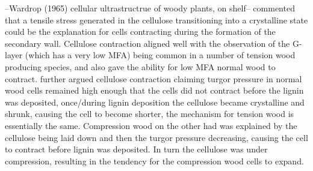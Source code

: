 --Wardrop (1965) cellular ultrastructrue of woody plants, on shelf-- commented that a tensile stress generated in the cellulose
transitioning into a crystalline state could be the explanation for cells
contracting during the formation of the secondary wall. Cellulose contraction
aligned well with the observation of the G-layer (which has  a very low
MFA) being common in a number of tension wood producing species, and also gave
the ability for low MFA normal wood to contract. \cite{Bamber1979} further argued
cellulose contraction claiming turgor pressure in normal wood cells remained
high enough that the cells did not contract before the lignin was deposited,
once/during lignin deposition the cellulose became crystalline and shrunk,
causing the cell to become shorter, the mechanism for tension wood is
essentially the same. Compression wood on the other had was explained by the
cellulose being laid down and then the turgor pressure decreasing, causing the
cell to contract before lignin was deposited. In turn the cellulose was under
compression, resulting in the tendency for the compression wood cells to
expand.